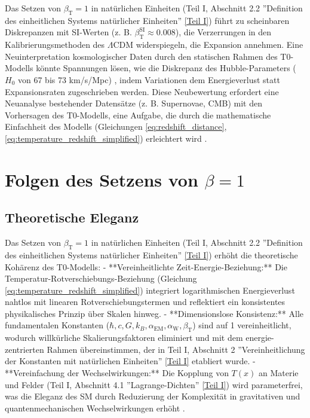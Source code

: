 \documentclass[12pt,a4paper]{article}
\newcommand{\Tfield}{T(x)}
\newcommand{\alphaEM}{\alpha_{\text{EM}}}
\newcommand{\alphaW}{\alpha_{\text{W}}}
\newcommand{\betaT}{\beta_{\text{T}}}
\begin{document}
	Das Setzen von \(\betaT = 1\) in natürlichen Einheiten (Teil I, Abschnitt 2.2 ''Definition des einheitlichen Systems natürlicher Einheiten'' \href{https://github.com/jpascher/T0-Time-Mass-Duality/tree/main/2/pdf/Deutsch/QMRelTimeMassPart1.pdf}{[Teil I]}) führt zu scheinbaren Diskrepanzen mit SI-Werten (z. B. \(\betaT^{\text{SI}} \approx 0.008\)), die Verzerrungen in den Kalibrierungsmethoden des \(\Lambda\)CDM widerspiegeln, die Expansion annehmen. Eine Neuinterpretation kosmologischer Daten durch den statischen Rahmen des T0-Modells könnte Spannungen lösen, wie die Diskrepanz des Hubble-Parameters (\(H_0\) von 67 bis 73 km/s/Mpc) \cite{DiValentino2021}, indem Variationen dem Energieverlust statt Expansionsraten zugeschrieben werden. Diese Neubewertung erfordert eine Neuanalyse bestehender Datensätze (z. B. Supernovae, CMB) mit den Vorhersagen des T0-Modells, eine Aufgabe, die durch die mathematische Einfachheit des Modells (Gleichungen \ref{eq:redshift_distance}, \ref{eq:temperature_redshift_simplified}) erleichtert wird \cite{pascher_alphabeta_2025}.
	
	\section{Folgen des Setzens von \(\beta = 1\)}
	\label{sec:consequences_beta}
	
	\subsection{Theoretische Eleganz}
	\label{subsec:theoretical_elegance}
	
	Das Setzen von \(\betaT = 1\) in natürlichen Einheiten (Teil I, Abschnitt 2.2 ''Definition des einheitlichen Systems natürlicher Einheiten'' \href{https://github.com/jpascher/T0-Time-Mass-Duality/tree/main/2/pdf/Deutsch/QMRelTimeMassPart1.pdf}{[Teil I]}) erhöht die theoretische Kohärenz des T0-Modells:
	- **Vereinheitlichte Zeit-Energie-Beziehung:** Die Temperatur-Rotverschiebungs-Beziehung (Gleichung \ref{eq:temperature_redshift_simplified}) integriert logarithmischen Energieverlust nahtlos mit linearen Rotverschiebungstermen und reflektiert ein konsistentes physikalisches Prinzip über Skalen hinweg.
	- **Dimensionslose Konsistenz:** Alle fundamentalen Konstanten (\(\hbar, c, G, k_B, \alphaEM, \alphaW, \betaT\)) sind auf 1 vereinheitlicht, wodurch willkürliche Skalierungsfaktoren eliminiert und mit dem energie-zentrierten Rahmen übereinstimmen, der in Teil I, Abschnitt 2 ''Vereinheitlichung der Konstanten mit natürlichen Einheiten'' \href{https://github.com/jpascher/T0-Time-Mass-Duality/tree/main/2/pdf/Deutsch/QMRelTimeMassPart1.pdf}{[Teil I]} etabliert wurde.
	- **Vereinfachung der Wechselwirkungen:** Die Kopplung von \(\Tfield\) an Materie und Felder (Teil I, Abschnitt 4.1 ''Lagrange-Dichten'' \href{https://github.com/jpascher/T0-Time-Mass-Duality/tree/main/2/pdf/Deutsch/QMRelTimeMassPart1.pdf}{[Teil I]}) wird parameterfrei, was die Eleganz des SM durch Reduzierung der Komplexität in gravitativen und quantenmechanischen Wechselwirkungen erhöht \cite{pascher_alphabeta_2025}.
	
\end{document}
